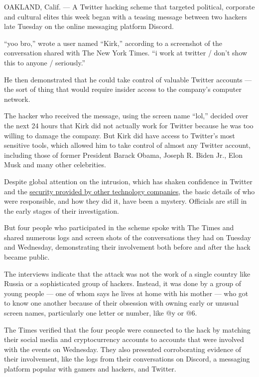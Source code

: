 OAKLAND, Calif. --- A Twitter hacking scheme that targeted political,
corporate and cultural elites this week began with a teasing message
between two hackers late Tuesday on the online messaging platform
Discord.

``yoo bro,'' wrote a user named ``Kirk,'' according to a screenshot of
the conversation shared with The New York Times. ``i work at twitter /
don't show this to anyone / seriously.''

He then demonstrated that he could take control of valuable Twitter
accounts --- the sort of thing that would require insider access to the
company's computer network.

The hacker who received the message, using the screen name ``lol,''
decided over the next 24 hours that Kirk did not actually work for
Twitter because he was too willing to damage the company. But Kirk did
have access to Twitter's most sensitive tools, which allowed him to take
control of almost any Twitter account, including those of former
President Barack Obama, Joseph R. Biden Jr., Elon Musk and many other
celebrities.

Despite global attention on the intrusion, which has shaken confidence
in Twitter and the
\href{https://www.nytimes.com/2020/07/16/us/politics/twitter-hack.html}{security
provided by other technology companies}, the basic details of who were
responsible, and how they did it, have been a mystery. Officials are
still in the early stages of their investigation.

But four people who participated in the scheme spoke with The Times and
shared numerous logs and screen shots of the conversations they had on
Tuesday and Wednesday, demonstrating their involvement both before and
after the hack became public.

The interviews indicate that the attack was not the work of a single
country like Russia or a sophisticated group of hackers. Instead, it was
done by a group of young people --- one of whom says he lives at home
with his mother --- who got to know one another because of their
obsession with owning early or unusual screen names, particularly one
letter or number, like @y or @6.

The Times verified that the four people were connected to the hack by
matching their social media and cryptocurrency accounts to accounts that
were involved with the events on Wednesday. They also presented
corroborating evidence of their involvement, like the logs from their
conversations on Discord, a messaging platform popular with gamers and
hackers, and Twitter.

